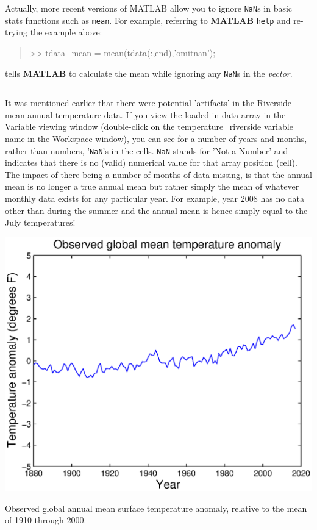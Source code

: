 \documentclass{tufte-book} %
\newenvironment{docspec}{\begin{quotation}\ttfamily\parskip0pt\parindent0pt\ignorespaces}{\end{quotation}}
\begin{document}
\vspace{1mm}
Actually, more recent versions of MATLAB allow you to ignore \texttt{NaN}s in basic stats functions such as \texttt{mean}. For example, referring to \textbf{MATLAB} \texttt{help} and re-trying the example above:
\begin{docspec}
>> tdata\_mean = mean(tdata(:,end),'omitnan');
\end{docspec}
tells \textbf{MATLAB} to calculate the mean while ignoring any \texttt{NaN}s in the \textit{vector}.

\newpage 

\vspace{1mm}
\noindent\rule{4cm}{0.5pt}
\vspace{2mm}

\noindent It was mentioned earlier that there were potential 'artifacts' in the Riverside mean annual temperature data. If you view the loaded in data array in the \textsf{Variable viewing window} (double-click on the \textsf{temperature\_riverside} variable name in the \textsf{Workspace window}), you can see for a number of years and months, rather than numbers, '\texttt{NaN}'s in the cells. \texttt{NaN} stands for 'Not a Number' and indicates that there is no (valid) numerical value for that array position (cell). The impact of there being a number of months of data missing, is that the annual mean is no longer a true annual mean but rather simply the mean of whatever monthly data exists for any particular year. For example, year 2008 has no data other than during the summer and the annual mean is hence simply equal to the July temperatures!

\begin{marginfigure}[-2.25in]
\includegraphics[width=\linewidth]{ch1-plot-temperature5.eps}
\caption{Observed global annual mean surface temperature anomaly, relative to the mean of 1910 through 2000.}
\label{fig:ch1-plot-temperature5}
\end{marginfigure}
\end{document}
